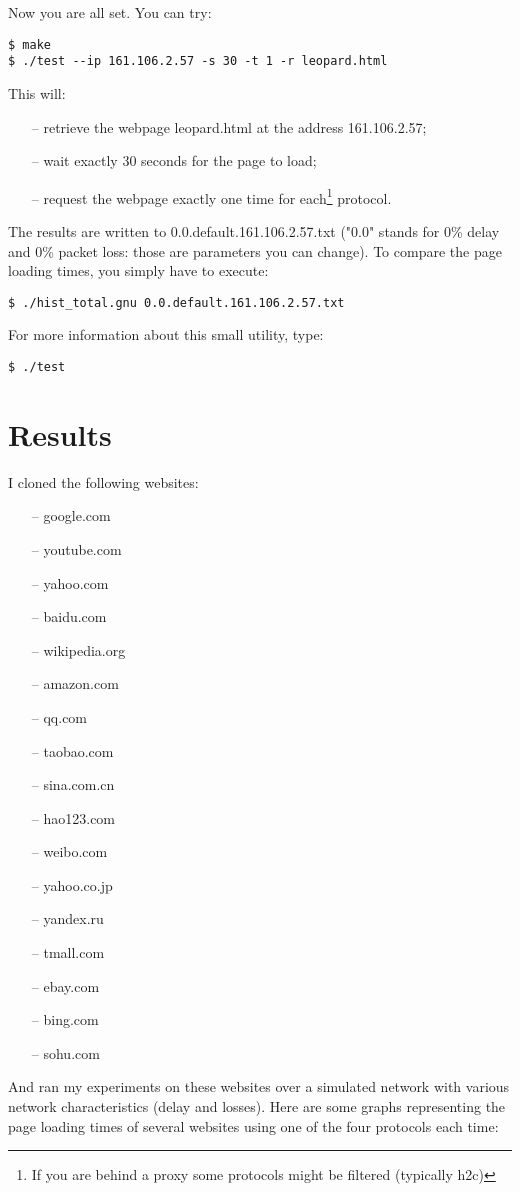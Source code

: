 \documentclass[12pt, notitlepage]{article}
\begin{document}
Now you are all set. You can try: 
\begin{lstlisting}
$ make
$ ./test --ip 161.106.2.57 -s 30 -t 1 -r leopard.html
\end{lstlisting}

\vspace*{0.5cm}
This will: 
\begin{itemize}[noitemsep]
\item[--] retrieve the webpage leopard.html at the address 
161.106.2.57;
\item[--] wait exactly 30 seconds for the page to load;
\item[--] request the webpage exactly one time for each\footnote{If you are
behind a proxy some protocols might be filtered (typically h2c)}
protocol.
\end{itemize}

The results are written to 0.0.default.161.106.2.57.txt ("0.0" stands for
0\% delay and 0\% packet loss: those are parameters you can change). To
compare the page loading times, you simply have to execute:
\begin{lstlisting}
$ ./hist_total.gnu 0.0.default.161.106.2.57.txt
\end{lstlisting}
For more information about this small utility, type:
\begin{lstlisting}
$ ./test
\end{lstlisting}

\newpage

\section{Results}
I cloned the following websites:
\begin{itemize}[noitemsep]
	\item[--] google.com
	\item[--] youtube.com
	\item[--] yahoo.com
	\item[--] baidu.com
	\item[--] wikipedia.org
	\item[--] amazon.com
	\item[--] qq.com
	\item[--] taobao.com
	\item[--] sina.com.cn
	\item[--] hao123.com
	\item[--] weibo.com
	\item[--] yahoo.co.jp
	\item[--] yandex.ru
	\item[--] tmall.com
	\item[--] ebay.com
	\item[--] bing.com
	\item[--] sohu.com
\end{itemize}
And ran my experiments on these websites over a simulated network with 
various network characteristics (delay and losses).
Here are some graphs representing the page loading times of several
websites using one of the four protocols each time:
\end{document}
